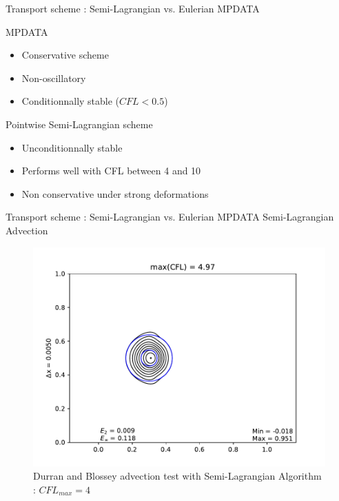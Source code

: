 \documentclass{beamer}
\begin{document}
\begin{frame}{Transport scheme : Semi-Lagrangian vs. Eulerian MPDATA}
    
    \begin{block}{MPDATA}
        \begin{itemize}
            \item[\textcolor{blue}{\faIcon{plus}}] Conservative scheme
            \item[\textcolor{blue}{\faIcon{plus}}] Non-oscillatory 
            \item[\textcolor{red}{\faIcon{minus}}] Conditionnally stable ($CFL < 0.5$)
        \end{itemize}
    \end{block}

    \begin{block}{Pointwise Semi-Lagrangian scheme}
        \begin{itemize} 
            \item[\textcolor{blue}{\faIcon{plus}}] Unconditionnally stable
            \item[\textcolor{blue}{\faIcon{plus}}] Performs well with CFL between 4 and 10
            \item[\textcolor{red}{\faIcon{minus}}] Non conservative under strong deformations
        \end{itemize}
    \end{block}
    
\end{frame}

\begin{frame}{Transport scheme : Semi-Lagrangian vs. Eulerian MPDATA}
    Semi-Lagrangian Advection
    \begin{figure}
        \centering
        \includegraphics[scale=0.5]{png/blossey_sl_005_unfiltered.pdf}
        \caption{Durran and Blossey advection test with Semi-Lagrangian Algorithm : $CFL_{max} = 4$}
        \label{fig:blossey}
    \end{figure}
\end{frame}
\end{document}
